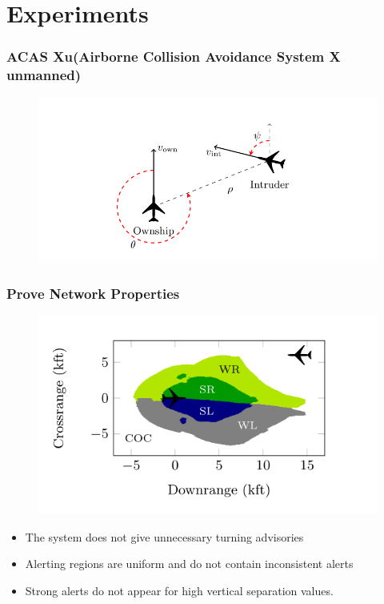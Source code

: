 \documentclass[aspectratio=169%
,serif,mathserif]{beamer}
\begin{document}



\section{Experiments}
\begin{frame}
	\frametitle{ACAS Xu(Airborne Collision Avoidance System X unmanned)}
	\begin{figure}
		\includegraphics[width=0.75\linewidth]{12.png}
	\end{figure}
\end{frame}

\begin{frame}
	\frametitle{Prove Network Properties}
	\begin{figure}
		\includegraphics[width=0.75\linewidth]{13.png}
	\end{figure}

	\begin{itemize}
		\item The system does not give unnecessary turning advisories
		\item Alerting regions are uniform and do not contain inconsistent alerts
		\item Strong alerts do not appear for high vertical separation values.
	\end{itemize}
\end{frame}
\end{document}
